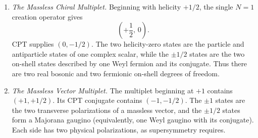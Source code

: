 \begin{enumerate}
  \begin{enumerate}
    \item \emph{The Massless Chiral Multiplet.}
    Beginning with helicity \(+1/2\), the single \(N=1\) creation operator
      gives
      \[
        \left(+\frac12,\,0\right).
      \]
      CPT supplies \((0,-1/2)\).  The two helicity-zero states are the particle
      and antiparticle states of one complex scalar, while the
      \(\pm1/2\) states are the two on-shell states described by one Weyl
      fermion and its conjugate.  Thus there are two real bosonic and two
      fermionic on-shell degrees of freedom.
    \item \emph{The Massless Vector Multiplet.}
    The multiplet beginning at \(+1\) contains
      \((+1,+1/2)\).  Its CPT conjugate contains
      \((-1,-1/2)\).  The \(\pm1\) states are the two transverse polarizations
      of a massless vector, and the \(\pm1/2\) states form a Majorana gaugino
      (equivalently, one Weyl gaugino with its conjugate).  Each side has two
      physical polarizations, as supersymmetry requires.
  \end{enumerate}


\end{enumerate}

